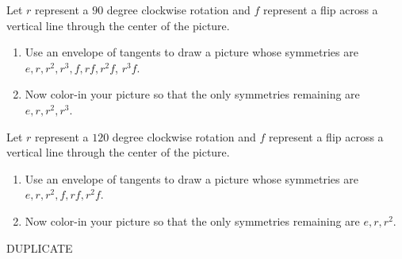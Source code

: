 \documentclass[noauthor,nooutcomes,hints]{ximera}
\begin{document}
\begin{question}
  Let $r$ represent a $90$ degree clockwise rotation and $f$
  represent a flip across a vertical line through the center of the
  picture.  
 \begin{enumerate}
 \item Use an envelope of tangents to draw a picture whose symmetries
   are $e,r,r^2,r^3,f,rf,r^2f$, $r^3f$.
 \item Now color-in your picture so that the only symmetries remaining
   are $e,r,r^2,r^3$.
 \end{enumerate}
\end{question}
\mynewpage



\begin{question}
  Let $r$ represent a $120$ degree clockwise rotation and $f$
  represent a flip across a vertical line through the center of the
  picture.  
 \begin{enumerate}
 \item Use an envelope of tangents to draw a picture whose symmetries
   are $e,r,r^2,f,rf,r^2f$.
 \item Now color-in your picture so that the only symmetries remaining
   are $e,r,r^2$.
 \end{enumerate}
 \begin{freeResponse}
   DUPLICATE
 \end{freeResponse}
\end{question}
\mynewpage
\end{document}
